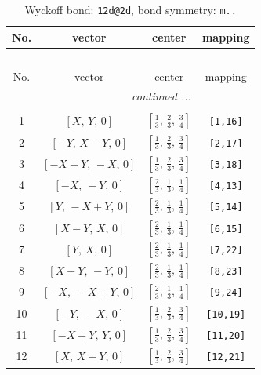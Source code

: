 \documentclass[fleqn,8pt]{jsarticle}
\begin{document}
\begin{longtable}{cccc}
\caption{Wyckoff bond: {\tt 12d@2d}, bond symmetry: {\tt m..}}
 \\
 \hline \hline
No. & vector & center & mapping \\ \hline \endfirsthead

\multicolumn{3}{l}{\tablename\ \thetable{}} \\
 \hline \hline
No. & vector & center & mapping \\ \hline \endhead

 \hline \hline
\multicolumn{3}{r}{\footnotesize\it continued ...} \\ \endfoot

 \hline \hline
\multicolumn{3}{r}{} \\ \endlastfoot

1 & $\left[ X,\, Y,\, 0 \right]$ & $\left[ \frac{1}{3},\, \frac{2}{3},\, \frac{3}{4} \right]$ & {\tt [1,16]} \\ \hline
2 & $\left[ - Y,\, X - Y,\, 0 \right]$ & $\left[ \frac{1}{3},\, \frac{2}{3},\, \frac{3}{4} \right]$ & {\tt [2,17]} \\ \hline
3 & $\left[ - X + Y,\, - X,\, 0 \right]$ & $\left[ \frac{1}{3},\, \frac{2}{3},\, \frac{3}{4} \right]$ & {\tt [3,18]} \\ \hline
4 & $\left[ - X,\, - Y,\, 0 \right]$ & $\left[ \frac{2}{3},\, \frac{1}{3},\, \frac{1}{4} \right]$ & {\tt [4,13]} \\ \hline
5 & $\left[ Y,\, - X + Y,\, 0 \right]$ & $\left[ \frac{2}{3},\, \frac{1}{3},\, \frac{1}{4} \right]$ & {\tt [5,14]} \\ \hline
6 & $\left[ X - Y,\, X,\, 0 \right]$ & $\left[ \frac{2}{3},\, \frac{1}{3},\, \frac{1}{4} \right]$ & {\tt [6,15]} \\ \hline
7 & $\left[ Y,\, X,\, 0 \right]$ & $\left[ \frac{2}{3},\, \frac{1}{3},\, \frac{1}{4} \right]$ & {\tt [7,22]} \\ \hline
8 & $\left[ X - Y,\, - Y,\, 0 \right]$ & $\left[ \frac{2}{3},\, \frac{1}{3},\, \frac{1}{4} \right]$ & {\tt [8,23]} \\ \hline
9 & $\left[ - X,\, - X + Y,\, 0 \right]$ & $\left[ \frac{2}{3},\, \frac{1}{3},\, \frac{1}{4} \right]$ & {\tt [9,24]} \\ \hline
10 & $\left[ - Y,\, - X,\, 0 \right]$ & $\left[ \frac{1}{3},\, \frac{2}{3},\, \frac{3}{4} \right]$ & {\tt [10,19]} \\ \hline
11 & $\left[ - X + Y,\, Y,\, 0 \right]$ & $\left[ \frac{1}{3},\, \frac{2}{3},\, \frac{3}{4} \right]$ & {\tt [11,20]} \\ \hline
12 & $\left[ X,\, X - Y,\, 0 \right]$ & $\left[ \frac{1}{3},\, \frac{2}{3},\, \frac{3}{4} \right]$ & {\tt [12,21]} \\
\end{longtable}
\end{document}
